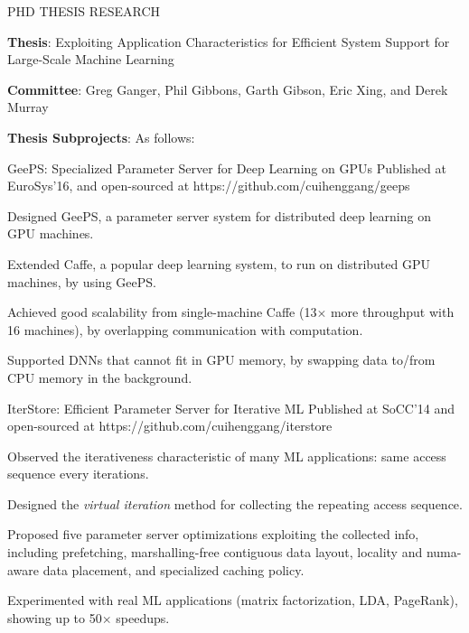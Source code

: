 \documentclass{resume} %
\begin{document}
\begin{rSection}{PHD THESIS RESEARCH}

\hspace{-1em} \textbf{Thesis}: Exploiting Application Characteristics for Efficient System Support for Large-Scale Machine Learning
\vspace{-.1in}
\begin{list}{\enskip\textbullet}{\leftmargin=2em}
\item \textbf{Committee}: Greg Ganger, Phil Gibbons, Garth Gibson, Eric Xing, and Derek Murray
\vspace{-.1in}
\item \textbf{Thesis Subprojects}: As follows:
\end{list}

\begin{rSubsection}{\hspace{-1em} GeePS: Specialized Parameter Server for Deep Learning on GPUs}{}
{Published at EuroSys'16, and open-sourced at https://github.com/cuihenggang/geeps}{}
\vspace{-0.3em}
\item Designed GeePS, a parameter server system for distributed deep learning on GPU machines.
\item Extended Caffe, a popular deep learning system, to run on distributed GPU machines, by using GeePS.
\item Achieved good scalability from single-machine Caffe (13$\times$ more throughput with 16 machines), by overlapping communication with computation.
\item Supported DNNs that cannot fit in GPU memory, by swapping data to/from CPU memory in the background.
\end{rSubsection}
\vspace{-.1in}

\begin{rSubsection}{\hspace{-1em} IterStore: Efficient Parameter Server for Iterative ML}{}
{Published at SoCC'14 and open-sourced at https://github.com/cuihenggang/iterstore}{}
\vspace{-0.3em}
\item Observed the iterativeness characteristic of many ML applications: same access sequence every iterations.
\item Designed the \emph{virtual iteration} method for collecting the repeating access sequence.
\item Proposed five parameter server optimizations exploiting the collected info, including prefetching, marshalling-free contiguous data layout, locality and numa-aware data placement, and specialized caching policy.
\item Experimented with real ML applications (matrix factorization, LDA, PageRank), showing up to 50$\times$ speedups.
\end{rSubsection}
\vspace{-.1in}


\end{rSection}
\end{document}

